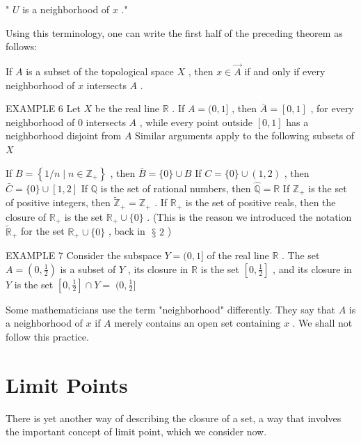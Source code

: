 \documentclass[10pt]{article}
\begin{document}
" \(U\) is a neighborhood of \(x\) ."

Using this terminology, one can write the first half of the preceding theorem as follows:

If \(A\) is a subset of the topological space \(X\) , then \(x \in  \overrightarrow{A}\) if and only if every neighborhood of \(x\) intersects \(A\) .

EXAMPLE 6 Let \(X\) be the real line \(\mathbb{R}\) . If \(A = (0,1\rbrack\) , then \(\bar{A} = \left\lbrack  {0,1}\right\rbrack\) , for every neighborhood of 0 intersects \(A\) , while every point outside \(\left\lbrack  {0,1}\right\rbrack\) has a neighborhood disjoint from \(A\) Similar arguments apply to the following subsets of \(X\)

If \(B = \left\{  {1/n \mid  n \in  {\mathbb{Z}}_{ + }}\right\}\) , then \(\bar{B} = \{ 0\}  \cup  B\) If \(C = \{ 0\}  \cup  \left( {1,2}\right)\) , then \(\bar{C} = \{ 0\}  \cup  \left\lbrack  {1,2}\right\rbrack\) If \(\mathbb{Q}\) is the set of rational numbers, then \(\widehat{\mathbb{Q}} = \mathbb{R}\) If \({\mathbb{Z}}_{ + }\) is the set of positive integers, then \({\widetilde{\mathbb{Z}}}_{ + } = {\mathbb{Z}}_{ + }\) . If \({\mathbb{R}}_{ + }\) is the set of positive reals, then the closure of \({\mathbb{R}}_{ + }\) is the set \({\mathbb{R}}_{ + } \cup  \{ 0\}\) . (This is the reason we introduced the notation \({\widetilde{\mathbb{R}}}_{ + }\) for the set \({\mathbb{R}}_{ + } \cup  \{ 0\}\) , back in \(\text{ § }2\) )

EXAMPLE 7 Consider the subspace \(Y = (0,1\rbrack\) of the real line \(\mathbb{R}\) . The set \(A = \left( {0,\frac{1}{2}}\right)\) is a subset of \(Y\) , its closure in \(\mathbb{R}\) is the set \(\left\lbrack  {0,\frac{1}{2}}\right\rbrack\) , and its closure in \(Y\) is the set \(\left\lbrack  {0,\frac{1}{2}}\right\rbrack   \cap  Y = \; (0,\frac{1}{2}\rbrack\)

Some mathematicians use the term "neighborhood" differently. They say that \(A\) is a neighborhood of \(x\) if \(A\) merely contains an open set containing \(x\) . We shall not follow this practice.

\section*{Limit Points}

There is yet another way of describing the closure of a set, a way that involves the important concept of limit point, which we consider now.
\end{document}

